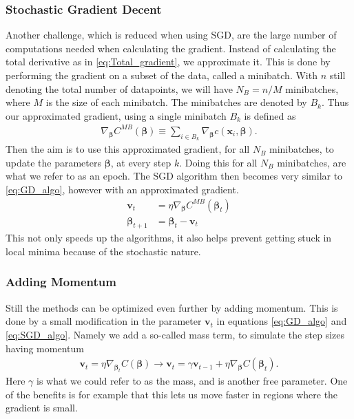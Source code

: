 \documentclass[12pt]{extarticle}
\begin{document}
\subsubsection{Stochastic Gradient Decent}\label{sec:SGD}
Another challenge, which is reduced when using SGD, are the large number of computations needed when calculating the gradient. Instead of calculating the total derivative as in \eqref{eq:Total_gradient}, we approximate it. This is done by performing the gradient on a subset of the data, called a minibatch. With $n$ still denoting the total number of datapoints, we will have $N_B=n/M$ minibatches, where $M$ is the size of each minibatch. The minibatches are denoted by $B_k$. Thus our approximated gradient, using a single minibatch $B_k$ is defined as
\begin{align}
\nabla_{\boldsymbol{\beta}} C^{MB}(\boldsymbol{\beta}) \equiv \sum_{i \in B_k} \nabla_{\boldsymbol{\beta}} c(\mathbf{x}_i, \boldsymbol{\beta}).
\end{align}
Then the aim is to use this approximated gradient, for all $N_B$ minibatches, to update the parameters $\boldsymbol{\beta}$, at every step $k$. Doing this for all $N_B$ minibatches, are what we refer to as an epoch. The SGD algorithm then becomes very similar to \eqref{eq:GD_algo}, however with an approximated gradient.
\begin{align}
\mathbf{v}_t &= \eta\nabla_{\boldsymbol{\beta}} C^{MB}(\boldsymbol{\beta}_t) \nonumber \\
\boldsymbol{\beta}_{t+1} &= \boldsymbol{\beta}_t - \mathbf{v}_t
\label{eq:SGD_algo}
\end{align}
This not only speeds up the algorithms, it also helps prevent getting stuck in local minima because of the stochastic nature.

\subsubsection{Adding Momentum}
Still the methods can be optimized even further by adding momentum. This is done by a small modification in the parameter $\mathbf{v}_t$ in equations \eqref{eq:GD_algo} and \eqref{eq:SGD_algo}. Namely we add a so-called mass term, to simulate the step sizes having momentum
\begin{align}
	\mathbf{v}_t = \eta \nabla_{\boldsymbol{\beta}_t} C(\boldsymbol{\beta}) \rightarrow \mathbf{v}_t = \gamma \mathbf{v}_{t-1} + \eta \nabla_{\boldsymbol{\beta}} C(\boldsymbol{\beta}_t).
\end{align}
Here $\gamma$ is what we could refer to as the mass, and is another free parameter. One of the benefits is for example that this lets us move faster in regions where the gradient is small.
\end{document}
